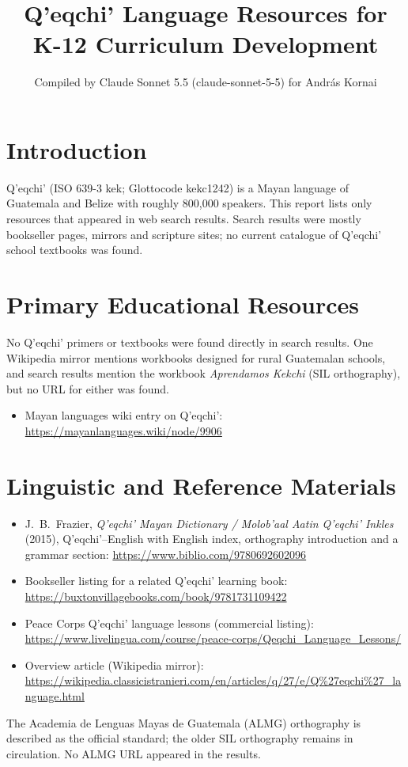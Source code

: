 \documentclass[12pt]{article}
\title{Q'eqchi' Language Resources for K-12 Curriculum Development}
\author{Compiled by Claude Sonnet 5.5 (claude-sonnet-5-5) for Andr\'as Kornai}
\date{}
\begin{document}
\maketitle

\section{Introduction}
Q'eqchi' (ISO 639-3 kek; Glottocode kekc1242) is a Mayan language of Guatemala and Belize with roughly 800,000 speakers. This report lists only resources that appeared in web search results. Search results were mostly bookseller pages, mirrors and scripture sites; no current catalogue of Q'eqchi' school textbooks was found.

\section{Primary Educational Resources}
No Q'eqchi' primers or textbooks were found directly in search results. One Wikipedia mirror mentions workbooks designed for rural Guatemalan schools, and search results mention the workbook \emph{Aprendamos Kekchi} (SIL orthography), but no URL for either was found.
\begin{itemize}
\item Mayan languages wiki entry on Q'eqchi': \url{https://mayanlanguages.wiki/node/9906}
\end{itemize}

\section{Linguistic and Reference Materials}
\begin{itemize}
\item J.\ B.\ Frazier, \emph{Q'eqchi' Mayan Dictionary / Molob'aal Aatin Q'eqchi' Inkles} (2015), Q'eqchi'--English with English index, orthography introduction and a grammar section: \url{https://www.biblio.com/9780692602096}
\item Bookseller listing for a related Q'eqchi' learning book: \url{https://buxtonvillagebooks.com/book/9781731109422}
\item Peace Corps Q'eqchi' language lessons (commercial listing): \url{https://www.livelingua.com/course/peace-corps/Qeqchi_Language_Lessons/}
\item Overview article (Wikipedia mirror): \url{https://wikipedia.classicistranieri.com/en/articles/q/27/e/Q%27eqchi%27_language.html}
\end{itemize}
The Academia de Lenguas Mayas de Guatemala (ALMG) orthography is described as the official standard; the older SIL orthography remains in circulation. No ALMG URL appeared in the results.
\end{document}
